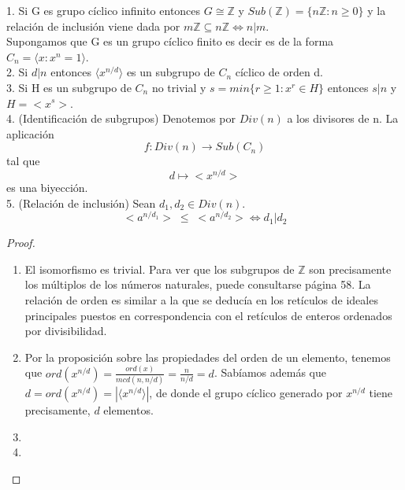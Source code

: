 \begin{nth}
1. Si G es grupo cíclico infinito entonces $G \cong \mathbb{Z}$ y $Sub(\mathbb{Z}) = \{n\mathbb{Z}:n \ge 0\}$ y la relación de inclusión viene dada por $m\mathbb{Z} \subseteq n\mathbb{Z} \iff n|m$. \\
Supongamos que G es un grupo cíclico finito es decir es de la forma $C_n = \langle x:x^n = 1 \rangle$.\\
2. Si $d|n$ entonces $\langle x^{n/d} \rangle$ es un subgrupo de $C_n$ cíclico de orden d. \\
3. Si H es un subgrupo de $C_n$ no trivial y $s = min\{r \ge 1:x^r \in H\}$ entonces $s|n$ y $H = <x^s>$. \\
4. (Identificación de subgrupos) Denotemos por $Div(n)$ a los divisores de n. La aplicación $$f:Div(n) \rightarrow Sub(C_n)$$ tal que $$d \mapsto <x^{n/d}>$$ es una biyección.  \\
5. (Relación de inclusión) Sean $d_1,d_2 \in Div(n)$. $$<a^{n/d_1}> \; \le \; <a^{n/d_2}> \iff d_1|d_2$$ 
\end{nth}
\begin{proof}
\begin{enumerate}
\item El isomorfismo es trivial. Para ver que los subgrupos de $\mathbb{Z}$ son precisamente los múltiplos de los números naturales, puede consultarse \cite{dorronsoro} página 58. La relación de orden es similar a la que se deducía en los retículos de ideales principales puestos en correspondencia con el retículos de enteros ordenados por divisibilidad. 
\item Por la proposición sobre las propiedades del orden de un elemento, tenemos que $ord(x^{n/d}) = \frac{ord(x)}{mcd(n,n/d)} = \frac{n}{n/d} = d$. Sabíamos además que $d = ord(x^{n/d}) = |\langle x^{n/d} \rangle|$, de donde el grupo cíclico generado por $x^{n/d}$ tiene precisamente, $d$ elementos. 
\item 
\item 
\end{enumerate}
\end{proof}

